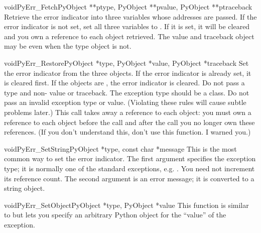 \begin{cfuncdesc}{void}{PyErr_Fetch}{PyObject **ptype, PyObject **pvalue,
                                     PyObject **ptraceback}
  Retrieve the error indicator into three variables whose addresses
  are passed.  If the error indicator is not set, set all three
  variables to \NULL.  If it is set, it will be cleared and you own a
  reference to each object retrieved.  The value and traceback object
  may be \NULL{} even when the type object is not.  
\end{cfuncdesc}

\begin{cfuncdesc}{void}{PyErr_Restore}{PyObject *type, PyObject *value,
                                       PyObject *traceback}
  Set  the error indicator from the three objects.  If the error
  indicator is already set, it is cleared first.  If the objects are
  \NULL, the error indicator is cleared.  Do not pass a \NULL{} type
  and non-\NULL{} value or traceback.  The exception type should be a
  class.  Do not pass an invalid exception type or value.
  (Violating these rules will cause subtle problems later.)  This call
  takes away a reference to each object: you must own a reference to
  each object before the call and after the call you no longer own
  these references.  (If you don't understand this, don't use this
  function.  I warned you.)  
\end{cfuncdesc}

\begin{cfuncdesc}{void}{PyErr_SetString}{PyObject *type, const char *message}
  This is the most common way to set the error indicator.  The first
  argument specifies the exception type; it is normally one of the
  standard exceptions, e.g. .  You need not
  increment its reference count.  The second argument is an error
  message; it is converted to a string object.
\end{cfuncdesc}

\begin{cfuncdesc}{void}{PyErr_SetObject}{PyObject *type, PyObject *value}
  This function is similar to  but lets
  you specify an arbitrary Python object for the ``value'' of the
  exception.
\end{cfuncdesc}

